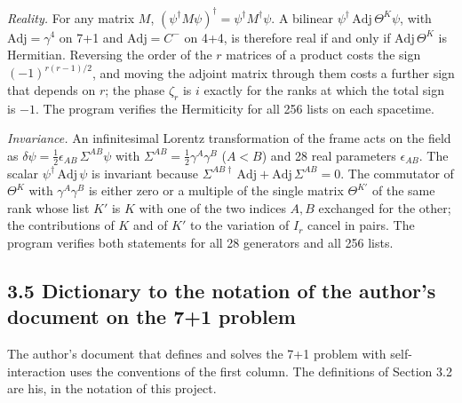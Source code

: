 \documentclass[
  10pt,
]{article}
\begin{document}
\emph{Reality.} For any matrix \(M\),
\((\psi^\dagger M\psi)^\dagger=\psi^\dagger M^\dagger\psi\). A bilinear
\(\psi^\dagger\,\mathrm{Adj}\,\Theta^K\psi\), with
\(\mathrm{Adj}=\gamma^4\) on 7+1 and \(\mathrm{Adj}=C^-\) on 4+4, is
therefore real if and only if \(\mathrm{Adj}\,\Theta^K\) is Hermitian.
Reversing the order of the \(r\) matrices of a product costs the sign
\((-1)^{r(r-1)/2}\), and moving the adjoint matrix through them costs a
further sign that depends on \(r\); the phase \(\zeta_r\) is \(i\)
exactly for the ranks at which the total sign is \(-1\). The program
verifies the Hermiticity for all 256 lists on each spacetime.

\emph{Invariance.} An infinitesimal Lorentz transformation of the frame
acts on the field as
\(\delta\psi=\tfrac12\epsilon_{AB}\,\Sigma^{AB}\psi\) with
\(\Sigma^{AB}=\tfrac12\gamma^A\gamma^B\) (\(A<B\)) and 28 real
parameters \(\epsilon_{AB}\). The scalar
\(\psi^\dagger\,\mathrm{Adj}\,\psi\) is invariant because
\(\Sigma^{AB\dagger}\,\mathrm{Adj}+\mathrm{Adj}\,\Sigma^{AB}=0\). The
commutator of \(\Theta^K\) with \(\gamma^A\gamma^B\) is either zero or a
multiple of the single matrix \(\Theta^{K'}\) of the same rank whose
list \(K'\) is \(K\) with one of the two indices \(A,B\) exchanged for
the other; the contributions of \(K\) and of \(K'\) to the variation of
\(I_r\) cancel in pairs. The program verifies both statements for all 28
generators and all 256 lists.

\hypertarget{dictionary-to-the-notation-of-the-authors-document-on-the-71-problem}{%
\subsection{3.5 Dictionary to the notation of the author's document on
the 7+1
problem}\label{dictionary-to-the-notation-of-the-authors-document-on-the-71-problem}}

The author's document that defines and solves the 7+1 problem with
self-interaction uses the conventions of the first column. The
definitions of Section 3.2 are his, in the notation of this project.
\end{document}
